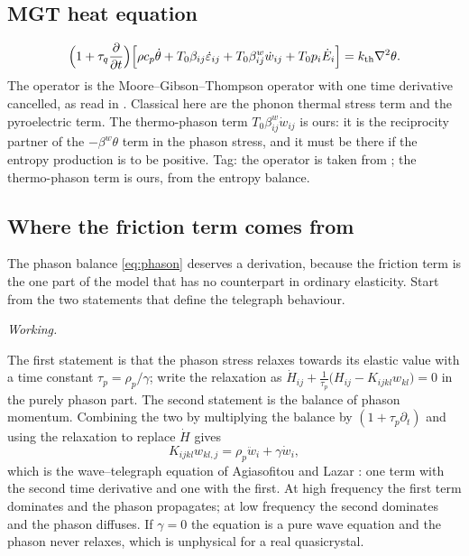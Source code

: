 \documentclass[11pt,a4paper]{article}
\newif\ifshowworked \showworkedtrue
\newenvironment{worked}{\ifshowworked\par\smallskip\noindent\textit{Working.}\par\else\setbox0\vbox\bgroup\fi}{\ifshowworked\par\smallskip\else\egroup\fi}
\newcommand{\eps}{\varepsilon}
\newcommand{\kB}{k_{\mathrm{th}}}
\newcommand{\bwth}{\beta^{w}}
\begin{document}
\subsection{MGT heat equation}

\begin{equation}\label{eq:heat}
\Bigl(1+\tau_q\frac{\partial}{\partial t}\Bigr)
\Bigl[\rho c_p\dot\theta+T_0\beta_{ij}\dot\eps_{ij}+T_0\bwth_{ij}\dot w_{ij}
+T_0p_i\dot E_i\Bigr]=\kB\nabla^2\theta .
\end{equation}
The operator is the Moore--Gibson--Thompson operator with one time derivative cancelled, as read in
\cite[Eqs.~(2.5) and (3.1)--(3.5)]{Quintanilla2019}. Classical here are the phonon thermal stress term and the pyroelectric term. The thermo-phason term $T_0\bwth_{ij}\dot w_{ij}$ is ours: it is the reciprocity partner of
the $-\bwth\theta$ term in the phason stress, and it must be there if the entropy production is to be
positive.
Tag: the operator is taken from \cite{Quintanilla2019}; the thermo-phason term is ours, from the entropy
balance.

\subsection{Where the friction term comes from}

The phason balance \eqref{eq:phason} deserves a derivation, because the friction term is the one part of the
model that has no counterpart in ordinary elasticity. Start from the two statements that define the
telegraph behaviour.

\begin{worked}
The first statement is that the phason stress relaxes towards its elastic value with a time constant
$\tau_p=\rho_p/\gamma$; write the relaxation as
$\dot H_{ij}+\frac{1}{\tau_p}\bigl(H_{ij}-K_{ijkl}w_{kl}\bigr)=0$ in the purely phason part. The second
statement is the balance of phason momentum. Combining the two by multiplying the balance by
$(1+\tau_p\partial_t)$ and using the relaxation to replace $\dot H$ gives
\[
K_{ijkl}w_{kl,j}=\rho_p\ddot w_i+\gamma\dot w_i ,
\]
which is the wave--telegraph equation of Agiasofitou and Lazar \cite[Eq.~(30)]{Agiasofitou2014}: one term with
the second time derivative and one with the first. At high frequency the first term dominates and the phason
propagates; at low frequency the second dominates and the phason diffuses. If $\gamma=0$ the equation is a
pure wave equation and the phason never relaxes, which is unphysical for a real quasicrystal.
\end{worked}
\end{document}
